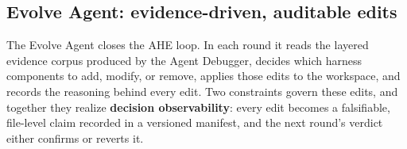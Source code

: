 



\subsection{Evolve Agent: evidence-driven, auditable edits}
\label{sec:method:evolve}

The Evolve Agent closes the AHE loop. In each round it reads the layered evidence corpus produced by the Agent Debugger, decides which harness components to add, modify, or remove, applies those edits to the workspace, and records the reasoning behind every edit. Two constraints govern these edits, and together they realize \textbf{decision observability}: every edit becomes a falsifiable, file-level claim recorded in a versioned manifest, and the next round's verdict either confirms or reverts it.

